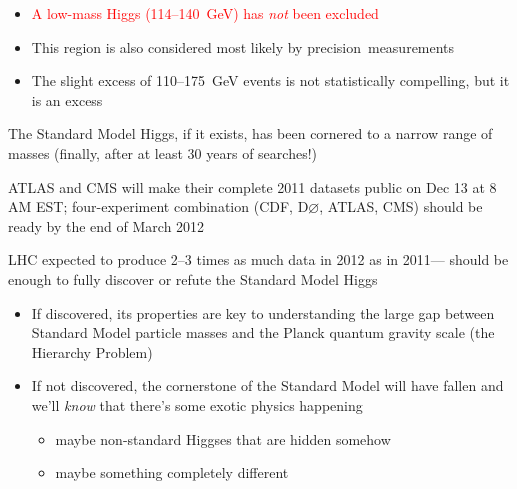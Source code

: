 \documentclass[compress]{beamer}
\begin{document}
\begin{frame}
\begin{itemize}
\item \textcolor{red}{A low-mass Higgs (114--140~GeV) has {\it not} been excluded}
\item This region is also considered most likely by \mbox{precision measurements\hspace{-1 cm}}
\item The slight excess of 110--175~GeV events is not statistically compelling, but it is an excess


\end{itemize}
\end{frame}

\begin{frame}

The Standard Model Higgs, if it exists, has been cornered to a narrow range of masses (finally, after at least 30 years of searches!)

\vfill
ATLAS and CMS will make their complete 2011 datasets public on Dec 13 at 8 AM EST; four-experiment combination (CDF, D$\varnothing$, ATLAS, CMS) should be ready by the end of March 2012

\vfill
LHC expected to produce 2--3 times as much data in 2012 as in 2011--- should be enough to fully discover or refute the Standard Model Higgs

\begin{itemize}
\item If discovered, its properties are key to understanding the large gap between Standard Model particle masses and the Planck quantum gravity scale (the Hierarchy Problem)

\item If not discovered, the cornerstone of the Standard Model will have fallen and we'll {\it know} that there's some exotic physics happening
\begin{itemize}
\item maybe non-standard Higgses that are hidden somehow
\item maybe something completely different
\end{itemize}
\end{itemize}
\end{frame}
\end{document}
